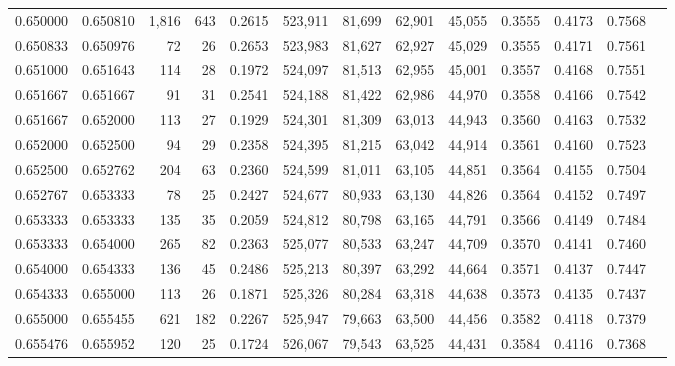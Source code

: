 \begin{tabular}{rrrrrrrrrrrrr}
0.650000 & 0.650810 & 1,816 & 643 &                                     0.2615 & 523,911 &  81,699 &  62,901 &  45,055 & 0.3555 & 0.4173 & 0.7568 \\
0.650833 & 0.650976 &    72 &  26 &                                     0.2653 & 523,983 &  81,627 &  62,927 &  45,029 & 0.3555 & 0.4171 & 0.7561 \\
0.651000 & 0.651643 &   114 &  28 &                                     0.1972 & 524,097 &  81,513 &  62,955 &  45,001 & 0.3557 & 0.4168 & 0.7551 \\
0.651667 & 0.651667 &    91 &  31 &                                     0.2541 & 524,188 &  81,422 &  62,986 &  44,970 & 0.3558 & 0.4166 & 0.7542 \\
0.651667 & 0.652000 &   113 &  27 &                                     0.1929 & 524,301 &  81,309 &  63,013 &  44,943 & 0.3560 & 0.4163 & 0.7532 \\
0.652000 & 0.652500 &    94 &  29 &                                     0.2358 & 524,395 &  81,215 &  63,042 &  44,914 & 0.3561 & 0.4160 & 0.7523 \\
0.652500 & 0.652762 &   204 &  63 &                                     0.2360 & 524,599 &  81,011 &  63,105 &  44,851 & 0.3564 & 0.4155 & 0.7504 \\
0.652767 & 0.653333 &    78 &  25 &                                     0.2427 & 524,677 &  80,933 &  63,130 &  44,826 & 0.3564 & 0.4152 & 0.7497 \\
0.653333 & 0.653333 &   135 &  35 &                                     0.2059 & 524,812 &  80,798 &  63,165 &  44,791 & 0.3566 & 0.4149 & 0.7484 \\
0.653333 & 0.654000 &   265 &  82 &                                     0.2363 & 525,077 &  80,533 &  63,247 &  44,709 & 0.3570 & 0.4141 & 0.7460 \\
0.654000 & 0.654333 &   136 &  45 &                                     0.2486 & 525,213 &  80,397 &  63,292 &  44,664 & 0.3571 & 0.4137 & 0.7447 \\
0.654333 & 0.655000 &   113 &  26 &                                     0.1871 & 525,326 &  80,284 &  63,318 &  44,638 & 0.3573 & 0.4135 & 0.7437 \\
0.655000 & 0.655455 &   621 & 182 &                                     0.2267 & 525,947 &  79,663 &  63,500 &  44,456 & 0.3582 & 0.4118 & 0.7379 \\
0.655476 & 0.655952 &   120 &  25 &                                     0.1724 & 526,067 &  79,543 &  63,525 &  44,431 & 0.3584 & 0.4116 & 0.7368 \\

\end{tabular}
